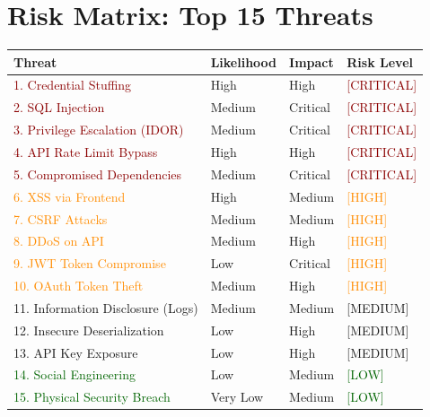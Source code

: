 \documentclass{report}
\begin{document}
\section{Risk Matrix: Top 15 Threats}

\begin{table}[h]
\centering
\small
\begin{tabular}{|p{3.5cm}|p{1.2cm}|p{1.2cm}|p{3cm}|}
\hline
\textbf{Threat} & \textbf{Likelihood} & \textbf{Impact} & \textbf{Risk Level} \\
\hline
\textcolor{darkred}{1. Credential Stuffing} & High & High & \textcolor{darkred}{[CRITICAL]} \\
\hline
\textcolor{darkred}{2. SQL Injection} & Medium & Critical & \textcolor{darkred}{[CRITICAL]} \\
\hline
\textcolor{darkred}{3. Privilege Escalation (IDOR)} & Medium & Critical & \textcolor{darkred}{[CRITICAL]} \\
\hline
\textcolor{darkred}{4. API Rate Limit Bypass} & High & High & \textcolor{darkred}{[CRITICAL]} \\
\hline
\textcolor{darkred}{5. Compromised Dependencies} & Medium & Critical & \textcolor{darkred}{[CRITICAL]} \\
\hline
\textcolor{darkorange}{6. XSS via Frontend} & High & Medium & \textcolor{darkorange}{[HIGH]} \\
\hline
\textcolor{darkorange}{7. CSRF Attacks} & Medium & Medium & \textcolor{darkorange}{[HIGH]} \\
\hline
\textcolor{darkorange}{8. DDoS on API} & Medium & High & \textcolor{darkorange}{[HIGH]} \\
\hline
\textcolor{darkorange}{9. JWT Token Compromise} & Low & Critical & \textcolor{darkorange}{[HIGH]} \\
\hline
\textcolor{darkorange}{10. OAuth Token Theft} & Medium & High & \textcolor{darkorange}{[HIGH]} \\
\hline
\textcolor{darkyellow}{11. Information Disclosure (Logs)} & Medium & Medium & \textcolor{darkyellow}{[MEDIUM]} \\
\hline
\textcolor{darkyellow}{12. Insecure Deserialization} & Low & High & \textcolor{darkyellow}{[MEDIUM]} \\
\hline
\textcolor{darkyellow}{13. API Key Exposure} & Low & High & \textcolor{darkyellow}{[MEDIUM]} \\
\hline
\textcolor{darkgreen}{14. Social Engineering} & Low & Medium & \textcolor{darkgreen}{[LOW]} \\
\hline
\textcolor{darkgreen}{15. Physical Security Breach} & Very Low & Medium & \textcolor{darkgreen}{[LOW]} \\
\hline
\end{tabular}
\end{table}
\end{document}
